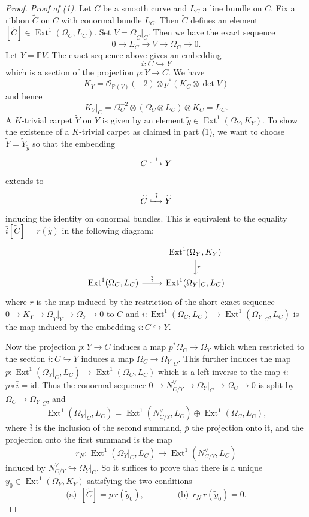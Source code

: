 \documentclass[11pt,twoside]{amsart}
\theoremstyle{plain}
\theoremstyle{definition}
\newcommand{\PP}{\mathbb{P}}
\newcommand{\OO}{\mathcal{O}}
\newcommand{\Ext}{\operatorname{Ext}}
\newcommand{\id}{\mathrm{id}}
\newcommand{\Yt}{\widetilde{Y}}
\newcommand{\Ct}{\widetilde{C}}
\newcommand{\yt}{\tilde{y}}
\begin{document}
\begin{proof}
\emph{Proof of (1).} Let $C$ be a smooth curve and $L_C$ a line bundle on $C$. Fix a ribbon $\Ct$ on $C$ with conormal bundle $L_C$. Then $\Ct$ defines an element $[\Ct]\in\Ext^1(\Omega_C,L_C)$. Set $V=\Omega_{\Ct}|_C$. Then we have the exact sequence
\[
0\to L_C\to V\to\Omega_C\to0 .
\]
Let $Y=\PP V$. The exact sequence above gives an embedding
\[
i\colon C\hookrightarrow Y
\]
which is a section of the projection $p\colon Y\to C$. We have
\[
K_Y=\OO_{\PP(V)}(-2)\otimes p^*(K_C\otimes\det V)
\]
and hence
\[
K_Y|_C=\Omega_C^{-2}\otimes(\Omega_C\otimes L_C)\otimes K_C=L_C .
\]
A $K$-trivial carpet $\Yt$ on $Y$ is given by an element $\yt\in\Ext^1(\Omega_Y,K_Y)$. To show the existence of a $K$-trivial carpet as claimed in part (1), we want to choose $\Yt=\Yt_{\yt}$ so that the embedding
\[
C\xhookrightarrow{\ i\ }Y
\]
extends to
\[
\Ct\xhookrightarrow{\ \tilde i\ }\Yt
\]
inducing the identity on conormal bundles. This is equivalent to the equality $\bar i[\Ct]=r(\yt)$ in the following diagram:
\begin{equation}\label{diag:ext}
\begin{tikzcd}
& \Ext^1(\Omega_Y,K_Y)\arrow[d,"r"]\\
\Ext^1(\Omega_C,L_C)\arrow[r,"\bar i"] & \Ext^1(\Omega_Y|_C,L_C)
\end{tikzcd}
\end{equation}
where $r$ is the map induced by the restriction of the short exact sequence $0\to K_Y\to\Omega_{\Yt}|_Y\to\Omega_Y\to0$ to $C$ and $\bar i\colon\Ext^1(\Omega_C,L_C)\to\Ext^1(\Omega_Y|_C,L_C)$ is the map induced by the embedding $i\colon C\hookrightarrow Y$.

Now the projection $p\colon Y\to C$ induces a map $p^*\Omega_C\to\Omega_Y$ which when restricted to the section $i\colon C\hookrightarrow Y$ induces a map $\Omega_C\to\Omega_Y|_C$. This further induces the map $\bar p\colon\Ext^1(\Omega_Y|_C,L_C)\to\Ext^1(\Omega_C,L_C)$ which is a left inverse to the map $\bar i$: $\bar p\circ\bar i=\id$. Thus the conormal sequence $0\to N_{C/Y}^{\vee}\to\Omega_Y|_C\to\Omega_C\to0$ is split by $\Omega_C\to\Omega_Y|_C$, and
\begin{equation}\label{eq:extsplit}
\Ext^1(\Omega_Y|_C,L_C)=\Ext^1(N_{C/Y}^{\vee},L_C)\oplus\Ext^1(\Omega_C,L_C),
\end{equation}
where $\bar i$ is the inclusion of the second summand, $\bar p$ the projection onto it, and the projection onto the first summand is the map
\[
r_N\colon\Ext^1(\Omega_Y|_C,L_C)\to\Ext^1(N_{C/Y}^{\vee},L_C)
\]
induced by $N_{C/Y}^{\vee}\hookrightarrow\Omega_Y|_C$. So it suffices to prove that there is a unique $\yt_0\in\Ext^1(\Omega_Y,K_Y)$ satisfying the two conditions
\begin{equation}\label{eq:twoconditions}
\text{(a)}\ \ [\Ct]=\bar p\,r(\yt_0),\qquad\qquad\text{(b)}\ \ r_N\,r(\yt_0)=0 .
\end{equation}


\end{proof}
\end{document}
